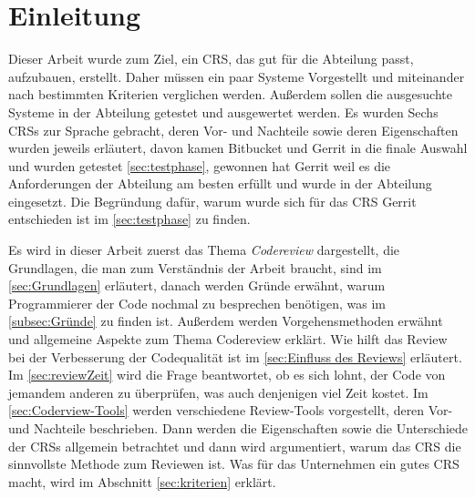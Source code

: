 \newpage

\section{Einleitung}
\label{sec:Einleitung}

Dieser Arbeit wurde zum Ziel, ein \ac{CRS}, das gut für die Abteilung passt, aufzubauen, erstellt. Daher müssen ein paar Systeme Vorgestellt und miteinander nach bestimmten Kriterien verglichen werden. Außerdem sollen die ausgesuchte Systeme in der Abteilung getestet und ausgewertet werden.
Es wurden Sechs \acp{CRS} zur Sprache gebracht, deren Vor- und Nachteile sowie deren Eigenschaften wurden jeweils erläutert, davon kamen Bitbucket und Gerrit in die finale Auswahl und wurden getestet \cref{sec:testphase}, gewonnen hat Gerrit weil es die Anforderungen der Abteilung am besten erfüllt und wurde in der Abteilung eingesetzt. Die Begründung dafür, warum wurde sich für das \ac{CRS} Gerrit entschieden ist im \cref{sec:testphase} zu finden.

Es wird in dieser Arbeit zuerst das Thema \emph{Codereview} dargestellt, die Grundlagen, die man zum Verständnis der Arbeit braucht, sind im \cref{sec:Grundlagen} erläutert, danach werden Gründe erwähnt, warum Programmierer der Code nochmal zu besprechen benötigen, was im \cref{subsec:Gründe} zu finden ist. Außerdem werden Vorgehensmethoden erwähnt und allgemeine Aspekte zum Thema Codereview erklärt. Wie hilft das Review bei der Verbesserung der Codequalität ist im \cref{sec:Einfluss des Reviews} erläutert. Im \cref{sec:reviewZeit} wird die Frage beantwortet, ob es sich lohnt, der Code von jemandem anderen zu überprüfen, was auch denjenigen viel Zeit kostet.
Im \cref{sec:Coderview-Tools} werden verschiedene Review-Tools vorgestellt, deren Vor- und Nachteile beschrieben. Dann werden die Eigenschaften sowie die Unterschiede der \acp{CRS} allgemein betrachtet und dann wird argumentiert, warum das \ac{CRS} die sinnvollste Methode zum Reviewen ist. Was für das Unternehmen ein gutes \ac{CRS} macht, wird im Abschnitt \ref{sec:kriterien} erklärt.